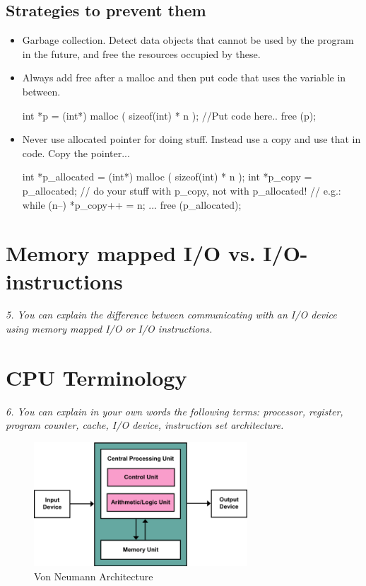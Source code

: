 \documentclass{article}
\begin{document}
\subsection{Strategies to prevent them}
\begin{itemize}
	\item Garbage collection. Detect data objects that cannot be used by the program in the future, and free the resources occupied by these.
	\item Always add free after a malloc and then put code that uses the variable in between.
	\begin{cpp}
int *p = (int*) malloc ( sizeof(int) * n );
//Put code here..
free (p);
	\end{cpp}
	\item Never use allocated pointer for doing stuff. Instead use a copy and use that in code. Copy the pointer...
	\begin{cpp}
int *p_allocated = (int*) malloc ( sizeof(int) * n );
int *p_copy = p_allocated;
// do your stuff with p_copy, not with p_allocated!
// e.g.:
while (n--) { *p_copy++ = n; }
...
free (p_allocated);
	\end{cpp}
\end{itemize}


\section{Memory mapped I/O vs. I/O-instructions}
\emph{5. You can explain the difference between communicating with an I/O device using memory mapped I/O or I/O instructions.}



\section{CPU Terminology}
\label{cpu-term}
\emph{6. You can explain in your own words the following terms: processor, register, program counter, cache, I/O device, instruction set architecture.}


\begin{figure}[H]
  \centering
  \includegraphics[width=8.0cm]{images/330px-Von_Neumann_Architecture.png}
  \caption{Von Neumann Architecture}
\end{figure}
\end{document}
